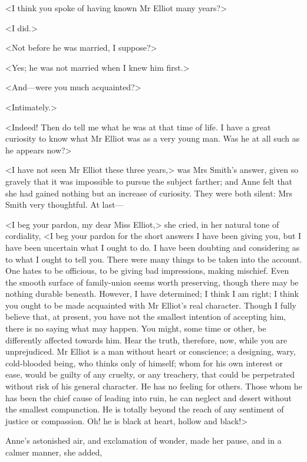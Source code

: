 <I think you spoke of having known Mr Elliot many years?>

<I did.>

<Not before he was married, I suppose?>

<Yes; he was not married when I knew him first.>

<And—were you much acquainted?>

<Intimately.>

<Indeed! Then do tell me what he was at that time of life. I have a great curiosity to know what Mr Elliot was as a very young man. Was he at all such as he appears now?>

<I have not seen Mr Elliot these three years,> was Mrs Smith's answer, given so gravely that it was impossible to pursue the subject farther; and Anne felt that she had gained nothing but an increase of curiosity. They were both silent: Mrs Smith very thoughtful. At last—

<I beg your pardon, my dear Miss Elliot,> she cried, in her natural tone of cordiality, <I beg your pardon for the short answers I have been giving you, but I have been uncertain what I ought to do. I have been doubting and considering as to what I ought to tell you. There were many things to be taken into the account. One hates to be officious, to be giving bad impressions, making mischief. Even the smooth surface of family-union seems worth preserving, though there may be nothing durable beneath. However, I have determined; I think I am right; I think you ought to be made acquainted with Mr Elliot's real character. Though I fully believe that, at present, you have not the smallest intention of accepting him, there is no saying what may happen. You might, some time or other, be differently affected towards him. Hear the truth, therefore, now, while you are unprejudiced. Mr Elliot is a man without heart or conscience; a designing, wary, cold-blooded being, who thinks only of himself; whom for his own interest or ease, would be guilty of any cruelty, or any treachery, that could be perpetrated without risk of his general character. He has no feeling for others. Those whom he has been the chief cause of leading into ruin, he can neglect and desert without the smallest compunction. He is totally beyond the reach of any sentiment of justice or compassion. Oh! he is black at heart, hollow and black!>

Anne's astonished air, and exclamation of wonder, made her pause, and in a calmer manner, she added,

